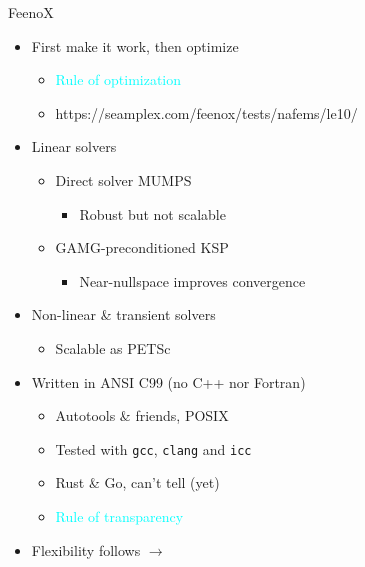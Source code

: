 \documentclass[
  ignorenonframetext,
  aspectratio=169,
]{beamer}
\newcommand{\passthrough}[1]{#1}
\providecommand{\tightlist}{%
  \setlength{\itemsep}{0pt}\setlength{\parskip}{0pt}}
\begin{document}
\begin{frame}[fragile]{}
\begin{columns}[T]
\pause

\begin{column}{0.525\textwidth}
\begin{exampleblock}{FeenoX}
\protect\hypertarget{feenox-5}{}
\begin{itemize}
\tightlist
\item
  First make it work, then optimize

  \begin{itemize}
  \item
    {\textcolor{cyan}{Rule of {optimization}}}
  \item
    https://seamplex.com/feenox/tests/nafems/le10/
  \end{itemize}
\item
  Linear solvers

  \begin{itemize}
  \tightlist
  \item
    Direct solver MUMPS

    \begin{itemize}
    \tightlist
    \item
      Robust but not scalable
    \end{itemize}
  \item
    GAMG-preconditioned KSP

    \begin{itemize}
    \tightlist
    \item
      Near-nullspace improves convergence
    \end{itemize}
  \end{itemize}
\item
  Non-linear \& transient solvers

  \begin{itemize}
  \tightlist
  \item
    Scalable as PETSc
  \end{itemize}
\item
  Written in ANSI C99 (no C++ nor Fortran)

  \begin{itemize}
  \item
    Autotools \& friends, POSIX
  \item
    Tested with \passthrough{\lstinline!gcc!},
    \passthrough{\lstinline!clang!} and \passthrough{\lstinline!icc!}
  \item
    Rust \& Go, can't tell (yet)
  \item
    {\textcolor{cyan}{Rule of {transparency}}}
  \end{itemize}
\item
  Flexibility follows \(\rightarrow\)
\end{itemize}
\end{exampleblock}
\end{column}
\end{columns}
\end{frame}
\end{document}
